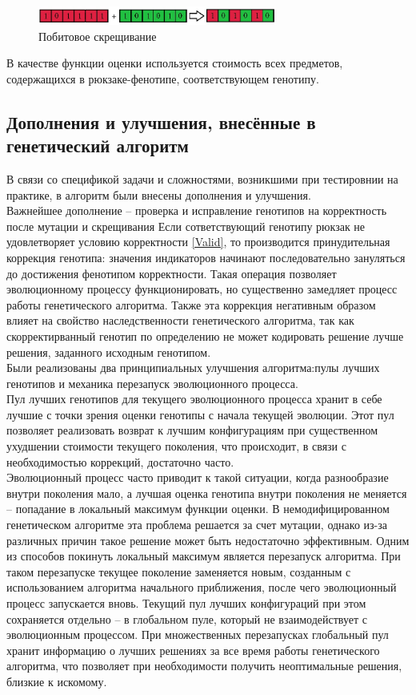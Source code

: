 	\begin{figure}[htbp]
	\includegraphics[width=0.7\textwidth]{./Pics/5.jpg}
	\caption{Побитовое скрещивание}
	\label{crossing3}
\end{figure}
\FloatBarrier
 В качестве функции оценки используется стоимость всех предметов, содержащихся в рюкзаке-фенотипе, соответствующем генотипу.
 
\subsection{Дополнения и улучшения, внесённые в генетический алгоритм}
В связи со спецификой задачи и сложностями, возникшими при тестировнии на практике, в алгоритм были внесены дополнения и улучшения. 
\\Важнейшее дополнение -- проверка и исправление генотипов на корректность после мутации и скрещивания Если сответствующий генотипу рюкзак не удовлетворяет условию корректности \ref{Valid}, то производится принудительная коррекция генотипа: значения индикаторов начинают последовательно зануляться до достижения фенотипом корректности. Такая операция позволяет эволюционному процессу функционировать, но существенно замедляет процесс работы генетического алгоритма. Также эта коррекция негативным образом влияет на свойство наследственности генетического алгоритма, так как скорректирванный генотип по определению не может кодировать решение лучше решения, заданного исходным генотипом.\\
Были реализованы два принципиальных улучшения алгоритма:пулы лучших генотипов и механика перезапуск эволюционного процесса.\\
Пул лучших генотипов для текущего эволюционного процесса хранит в себе лучшие с точки зрения оценки генотипы с начала текущей эволюции. Этот пул позволяет реализовать возврат к лучшим конфигурациям при существенном ухудшении стоимости текущего поколения, что происходит, в связи с необходимостью коррекций, достаточно часто.\\
Эволюционный процесс часто приводит к такой ситуации, когда разнообразие внутри поколения мало, а лучшая оценка генотипа внутри поколения не меняется -- попадание в локальный максимум функции оценки. В немодифицированном генетическом алгоритме эта проблема решается за счет мутации, однако из-за различных причин такое решение может быть недостаточно эффективным. Одним из способов покинуть локальный максимум является перезапуск алгоритма. При таком перезапуске текущее поколение заменяется новым, созданным с использованием алгоритма начального приближения, после чего эволюционный процесс запускается вновь. Текущий пул лучших конфигураций при этом сохраняется отдельно -- в глобальном пуле, который не взаимодействует с эволюционным процессом. При множественных перезапусках глобальный пул хранит информацию о лучших решениях за все время работы генетического алгоритма, что позволяет при необходимости получить неоптимальные решения, близкие к искомому.
